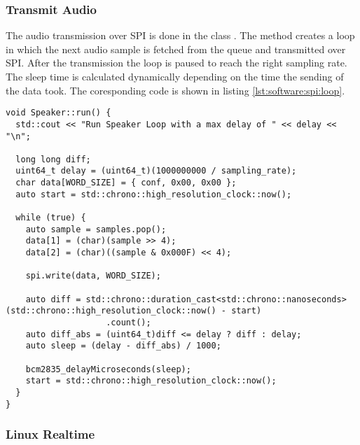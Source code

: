 \subsubsection*{Transmit Audio}

The audio transmission over SPI is done in the class . The method  creates a loop in which the next audio sample is fetched from the  queue and transmitted over SPI. After the transmission the loop is paused to reach the right sampling rate. The sleep time is calculated dynamically depending on the time the sending of the data took. The coresponding code is shown in listing \ref{lst:software:spi:loop}.
%
\begin{mdframed}
\begin{lstlisting}[caption=Audio transmission loop, label=lst:software:spi:loop]
void Speaker::run() {
  std::cout << "Run Speaker Loop with a max delay of " << delay << "\n";

  long long diff;
  uint64_t delay = (uint64_t)(1000000000 / sampling_rate);
  char data[WORD_SIZE] = { conf, 0x00, 0x00 };
  auto start = std::chrono::high_resolution_clock::now();

  while (true) {
    auto sample = samples.pop();
    data[1] = (char)(sample >> 4);
    data[2] = (char)((sample & 0x000F) << 4);

    spi.write(data, WORD_SIZE);

    auto diff = std::chrono::duration_cast<std::chrono::nanoseconds>(std::chrono::high_resolution_clock::now() - start)
                    .count();
    auto diff_abs = (uint64_t)diff <= delay ? diff : delay;
    auto sleep = (delay - diff_abs) / 1000;

    bcm2835_delayMicroseconds(sleep);
    start = std::chrono::high_resolution_clock::now();
  }
}
\end{lstlisting}
\end{mdframed}
%

\subsubsection*{Linux Realtime}

